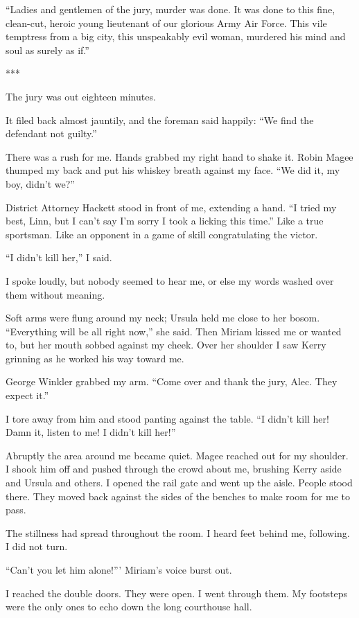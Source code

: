 \documentclass{novel}
\begin{document}
{“Ladies and gentlemen of the jury, murder was done. It was done to this fine, clean-cut, heroic young lieutenant of our glorious Army Air Force. This vile temptress from a big city, this unspeakably evil woman, murdered his mind and soul as surely as if.”

***

The jury was out eighteen minutes.

It filed back almost jauntily, and the foreman said happily: “We find the defendant not guilty.”

There was a rush for me. Hands grabbed my right hand to shake it. Robin Magee thumped my back and put his whiskey breath against my face. “We did it, my boy, didn’t we?”

District Attorney Hackett stood in front of me, extending a hand. “I tried my best, Linn, but I can’t say I’m sorry I took a licking this time.” Like a true sportsman. Like an opponent in a game of skill congratulating the victor.

“I didn’t kill her,” I said.

I spoke loudly, but nobody seemed to hear me, or else my words washed over them without meaning.

Soft arms were flung around my neck; Ursula held me close to her bosom. “Everything will be all right now,” she said. Then Miriam kissed me or wanted to, but her mouth sobbed against my cheek. Over her shoulder I saw Kerry grinning as he worked his way toward me.

George Winkler grabbed my arm. “Come over and thank the jury, Alec. They expect it.”

I tore away from him and stood panting against the table. “I didn’t kill her! Damn it, listen to me! I didn’t kill her!”

Abruptly the area around me became quiet. Magee reached out for my shoulder. I shook him off and pushed through the crowd about me, brushing Kerry aside and Ursula and others. I opened the rail gate and went up the aisle. People stood there. They moved back against the sides of the benches to make room for me to pass.

The stillness had spread throughout the room. I heard feet behind me, following. I did not turn.

“Can’t you let him alone!”’ Miriam’s voice burst out.

I reached the double doors. They were open. I went through them. My footsteps were the only ones to echo down the long courthouse hall.

}
\end{document}
